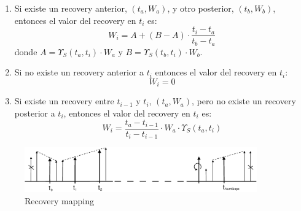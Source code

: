 \begin{enumerate}
\item Si existe un recovery anterior, $(t_a,W_a)$, y otro posterior, $(t_b,W_b)$,
entonces el valor del recovery en $t_i$ es:
\begin{displaymath}
W_i = A + (B-A) \cdot \frac{t_i-t_a}{t_b-t_a}
\end{displaymath}
donde
$A=\Upsilon_S(t_a,t_i) \cdot W_a$ y $B=\Upsilon_S(t_b,t_i) \cdot W_b$.
\item Si no existe un recovery anterior a $t_i$ entonces el valor del recovery
en $t_i$:
\begin{displaymath}
W_i = 0
\end{displaymath}
\item Si existe un recovery entre $t_{i-1}$ y $t_i$, $(t_a,W_a)$, pero no existe un
recovery posterior a $t_i$, entonces el valor del recovery en $t_i$ es:
\begin{displaymath}
W_i = \frac{t_a-t_{i-1}}{t_i-t_{i-1}} \cdot W_a \cdot \Upsilon_S(t_a,t_i)
\end{displaymath}
\end{enumerate}

\begin{figure}[!hb]
\begin{center}
\includegraphics[width=10cm,angle=0]{./images/nettingmapping.eps}
\caption{Recovery mapping}
\label{timetranches}
\end{center}
\end{figure}

